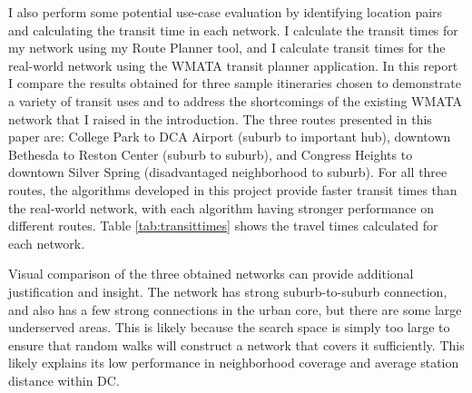 \documentclass[sigconf,nonacm]{acmart}
\begin{document}
I also perform some potential use-case evaluation by identifying location pairs and calculating the transit time in each network. I calculate the transit times for my network using my Route Planner tool, and I calculate transit times for the real-world network using the WMATA transit planner application. In this report I compare the results obtained for three sample itineraries chosen to demonstrate a variety of transit uses and to address the shortcomings of the existing WMATA network that I raised in the introduction. The three routes presented in this paper are: College Park to DCA Airport (suburb to important hub), downtown Bethesda to Reston Center (suburb to suburb), and Congress Heights to downtown Silver Spring (disadvantaged neighborhood to suburb). For all three routes, the algorithms developed in this project provide faster transit times than the real-world network, with each algorithm having stronger performance on different routes. Table \ref{tab:transittimes} shows the travel times calculated for each network. 

\begin{table}[h]
\caption{Sample Transit Times for Selected Origin-Destination Pairs}
\label{tab:transittimes}
\end{table}

Visual comparison of the three obtained networks can provide additional justification and insight. The network has strong suburb-to-suburb connection, and also has a few strong connections in the urban core, but there are some large underserved areas. This is likely because the search space is simply too large to ensure that random walks will construct a network that covers it sufficiently. This likely explains its low performance in neighborhood coverage and average station distance within DC.
\end{document}
